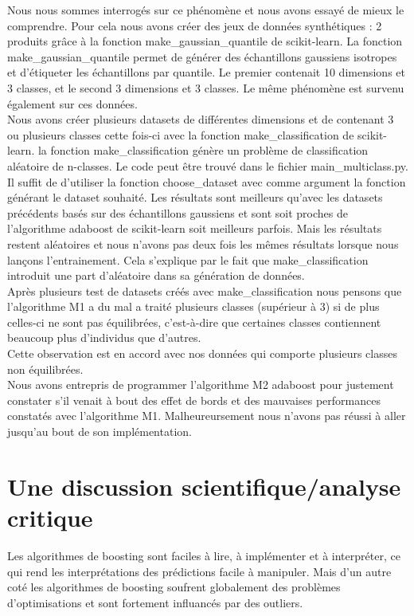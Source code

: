 \documentclass{article}
\begin{document}
Nous nous sommes interrogés sur ce phénomène et nous avons essayé de mieux le comprendre. Pour cela nous avons créer des jeux de données synthétiques : 
2 produits grâce à la fonction make\_gaussian\_quantile de scikit-learn. La fonction make\_gaussian\_quantile permet de 
générer des échantillons gaussiens isotropes et d'étiqueter les échantillons par quantile. Le premier contenait 10 dimensions et 3 classes, et le second 3 dimensions et 3 classes. Le même phénomène est survenu également sur ces données. \\

Nous avons créer plusieurs datasets de différentes dimensions et de contenant 3 ou plusieurs classes cette fois-ci avec la fonction make\_classification de scikit-learn. la fonction make\_classification génère un problème de classification aléatoire de n-classes. Le code peut être trouvé dans le fichier main\_multiclass.py. Il suffit de d'utiliser la fonction choose\_dataset avec comme argument la fonction générant le dataset souhaité. Les résultats sont meilleurs qu'avec les datasets précédents basés sur des échantillons gaussiens et sont soit proches de l'algorithme adaboost de scikit-learn soit meilleurs parfois. Mais les résultats restent aléatoires et nous n'avons pas deux fois les mêmes résultats lorsque nous lançons l'entrainement. Cela s'explique par le fait que make\_classification introduit une part d'aléatoire dans sa génération de données. \\

Après plusieurs test de datasets créés avec make\_classification nous pensons que l'algorithme M1 a du mal a traité plusieurs classes (supérieur à 3) si de plus celles-ci ne sont pas équilibrées, c'est-à-dire que certaines classes contiennent beaucoup plus d'individus que d'autres.\\ 

Cette observation est en accord avec nos données qui comporte plusieurs classes non équilibrées. \\

Nous avons entrepris de programmer l'algorithme M2 adaboost pour justement constater s'il venait à bout des effet de bords  et des mauvaises performances constatés avec l'algorithme M1. 
Malheureursement nous n'avons pas réussi à aller jusqu'au bout de son implémentation. 

\section{Une discussion scientifique/analyse critique}
Les algorithmes de boosting sont faciles à lire, à implémenter et à interpréter, ce qui rend les interprétations des prédictions facile à manipuler\cite{FreundSchapire1996}. Mais d'un autre coté les algorithmes de boosting soufrent globalement des problèmes d'optimisations et sont fortement influancés par des outliers.\\
\end{document}
